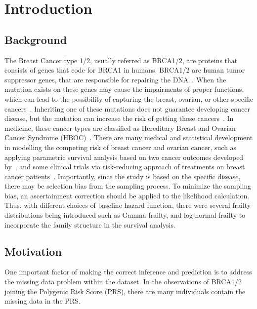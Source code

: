 \chapter{Introduction}
\section{Background}
The Breast Cancer type 1/2, usually referred as BRCA1/2, are proteins that consists of genes that code for BRCA1 in humans. BRCA1/2 are human tumor suppressor genes, that are responsible for repairing the DNA~\cite{duncan1998brca1}. 
When the mutation exists on these genes may cause the impairments of proper functions, which can lead to the possibility of capturing the breast, ovarian, or other specific cancers~\cite{greer2006role, haffty2002outcome, huang2018association}. 
Inheriting one of these mutations does not guarantee developing cancer disease, but the mutation can increase the risk of getting those cancers~\cite{friedenson2007brca1}. 
In medicine, these cancer types are classified as Hereditary Breast and Ovarian Cancer Syndrome (HBOC)~\cite{lux2006hereditary}. 
There are many medical and statistical development in modelling the competing risk of breast cancer and ovarian cancer, such as applying parametric survival analysis based on two cancer outcomes developed by~\citet{choi2021competing}, and some clinical trials via risk-reducing approach of treatments on breast cancer patients~\cite{choi2021association}.
Importantly, since the study is based on the specific disease, there may be selection bias from the sampling process. To minimize the sampling bias, an ascertainment correction should be applied to the likelihood calculation. Thus, with different choices of baseline hazard function, there were several frailty distributions being introduced such as Gamma frailty, 
and log-normal frailty to incorporate the family structure in the survival analysis. 

\section{Motivation}
One important factor of making the correct inference and prediction is to address the missing data problem within the dataset. In the observations of BRCA1/2 joining the Polygenic Risk Score (PRS), there are many individuals contain the missing data in the PRS. 

